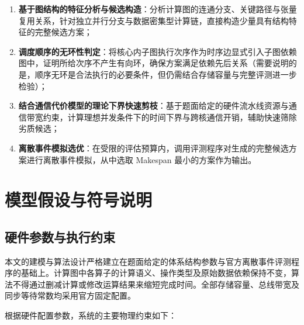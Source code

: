 \documentclass[anonymous,notoc]{gmcm2026}
\providecommand{\tightlist}{\setlength{\itemsep}{0pt}\setlength{\parskip}{0pt}}
\begin{document}
\begin{enumerate}
\def\labelenumi{\arabic{enumi}.}
\tightlist
\item
  \textbf{基于图结构的特征分析与候选构造}：分析计算图的连通分支、关键路径与张量复用关系，针对独立并行分支与数据密集型计算链，直接构造少量具有结构特征的完整候选方案；
\item
  \textbf{调度顺序的无环性判定}：将核心内子图执行次序作为时序边显式引入子图依赖图中，证明所给次序不产生有向环，确保方案满足依赖先后关系（需要说明的是，顺序无环是合法执行的必要条件，但仍需结合存储容量与完整评测进一步检验）；
\item
  \textbf{结合通信代价模型的理论下界快速剪枝}：基于题面给定的硬件流水线资源与通信带宽约束，计算理想并发条件下的时间下界与跨核通信开销，辅助快速筛除劣质候选；
\item
  \textbf{离散事件模拟选优}：在受限的评估预算内，调用评测程序对生成的完整候选方案进行离散事件模拟，从中选取 Makespan 最小的方案作为输出。
\end{enumerate}


\section{模型假设与符号说明}

\subsection{硬件参数与执行约束}

本文的建模与算法设计严格建立在题面给定的体系结构参数与官方离散事件评测程序的基础上。计算图中各算子的计算语义、操作类型及原始数据依赖保持不变，算法不得通过删减计算或修改运算结果来缩短完成时间。全部存储容量、总线带宽及同步等待常数均采用官方固定配置\cite{ref1}。

根据硬件配置参数，系统的主要物理约束如下：
\end{document}
